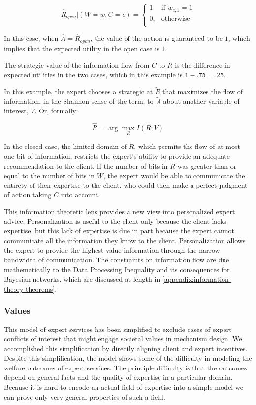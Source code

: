 \documentclass[../thesis.tex]{subfiles}
\begin{document}
\begin{exm}
  $$\hat{R}_{open} \vert (W = w, C = c) = \begin{cases}
    1 & \text{if } w_{c,1} = 1 \\
    0, & \text{otherwise}\\
  \end{cases}$$

  In this case, when $\hat{A} = \hat{R}_{open}$,
  the value of the action is guaranteed to be $1$,
  which implies that the expected utility in the
  open case is $1$.

  The strategic value of the information flow from
  $C$ to $R$ is the difference in expected utilities
  in the two cases, which in this example is $1 - .75 = .25$.
\end{exm}

In this example, the expert chooses a strategic at
$\tilde{R}$ that maximizes the flow of information,
in the Shannon sense of the term,
to $\tilde{A}$ about another variable of interest,
$V$. Or, formally:

$$\hat{R} = \arg \max_{R} I(R;V)$$

In the closed case, the limited domain of $\tilde{R}$,
which permits the flow of at most one bit of information,
restricts the expert's ability to provide an adequate
recommendation to the client.
If the number of bits in $R$ was greater than or
equal to the number of bits in $W$, the expert would
be able to communicate the entirety of their expertise
to the client, who could then make a perfect judgment
of action taking $C$ into account.

This information theoretic lens provides a new view
into personalized expert advice.
Personalization is useful to the client only because
the client lacks expertise, but this lack of expertise
is due in part because the expert cannot communicate
all the information they know to the client.
Personalization allows the expert to provide the highest
value information through the narrow bandwidth of
communication.
The constraints on information flow are due mathematically
to the Data Processing Inequality and its consequences
for Bayesian networks, which are discussed at length in
\ref{appendix:information-theory-theorems}.

\subsubsection{Values}

This model of expert services has been simplified
to exclude cases of expert conflicts of interest
that might engage societal values in mechanism
design.
We accomplished this simplification by directly
aligning client and expert incentives.
Despite this simplification, the model
shows some of the difficulty in modeling
the welfare outcomes of expert services.
The principle difficulty is that the outcomes
depend on general facts and the quality of
expertise in a particular domain.
Because it is hard to encode an actual field
of expertise into a simple model we can prove only
very general properties of
such a field.
\end{document}
